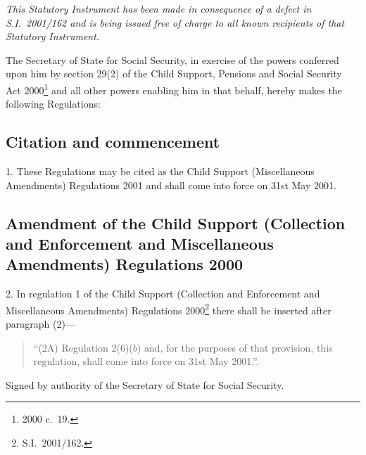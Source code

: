 \documentclass[12pt,a4paper]{article}
\title{\regstitle}
\author{S.I.\ 2001 No.\ 1775}
\date{Made
8th May 2001\\
Laid before Parliament
10th May 2001\\
Coming into force
31st May 2001
}
\begin{document}
\maketitle

\begin{center}
\itshape\small
This Statutory Instrument has been made in consequence of a defect in S.I.~2001/162 and is being issued free of charge to all known recipients of that Statutory Instrument. 
\end{center}

\noindent
The Secretary of State for Social Security, in exercise of the powers conferred upon him by section 29(2) of the Child Support, Pensions and Social Security Act 2000\footnote{2000 c.\ 19.} and all other powers enabling him in that behalf, hereby makes the following Regulations: 

{\sloppy

\tableofcontents

}

\bigskip

\setcounter{secnumdepth}{-2}

\subsection[1. Citation and commencement]{Citation and commencement}

1.  These Regulations may be cited as the Child Support (Miscellaneous Amendments) Regulations 2001 and shall come into force on 31st May 2001.

\subsection[2. Amendment of the Child Support (Collection and Enforcement and Miscellaneous Amendments) Regulations 2000]{Amendment of the Child Support (Collection and Enforcement and Miscellaneous Amendments) Regulations 2000}

2.  In regulation 1 of the Child Support (Collection and Enforcement and Miscellaneous Amendments) Regulations 2000\footnote{S.I.\ 2001/162.} there shall be inserted after paragraph (2)—
\begin{quotation}
“(2A) Regulation 2(6)($b$)  and, for the purposes of that provision, this regulation, shall come into force on 31st May 2001.”.
\end{quotation}

\bigskip

Signed 
by authority of the Secretary of State for Social Security.
\end{document}

